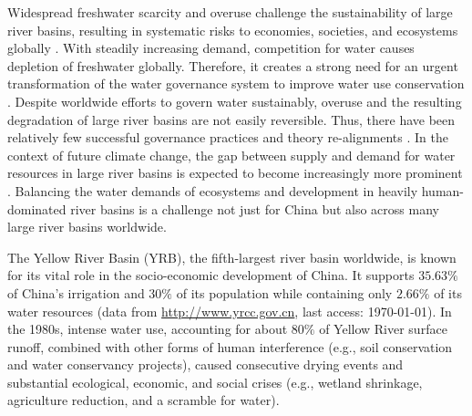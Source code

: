 Widespread freshwater scarcity and overuse challenge the sustainability of large river basins, resulting in systematic risks to economies, societies, and ecosystems globally \cite{distefano2017, dolan2021, xu2020b, mekonnen2016}.
With steadily increasing demand, competition for water causes depletion of freshwater globally. Therefore, it creates a strong need for an urgent transformation of the water governance system to improve water use conservation \cite{gleick2010, ziolkowska2016, wang2019d}.
Despite worldwide efforts to govern water sustainably, overuse and the resulting degradation of large river basins are not easily reversible. Thus, there have been relatively few successful governance practices and theory re-alignments
\cite{giuliani2013, falkenmark2019, jaeger2019}.
In the context of future climate change, the gap between supply and demand for water resources in large river basins is expected to become increasingly more prominent \cite{florke2018, yoon2021}.
Balancing the water demands of ecosystems and development in heavily human-dominated river basins is a challenge not just for China but also across many large river basins worldwide.

The Yellow River Basin (YRB), the fifth-largest river basin worldwide, is known for its vital role in the socio-economic development of China.
It supports $35.63\%$ of China's irrigation and $30\%$ of its population while containing only $2.66\%$ of its water resources (data from \href{http://www.yrcc.gov.cn}{http://www.yrcc.gov.cn}, last access: \today).
In the 1980s, intense water use, accounting for about $80\%$ of Yellow River surface runoff, combined with other forms of human interference (e.g., soil conservation and water conservancy projects), caused consecutive drying events and substantial ecological, economic, and social crises (e.g., wetland shrinkage, agriculture reduction, and a scramble for water).

